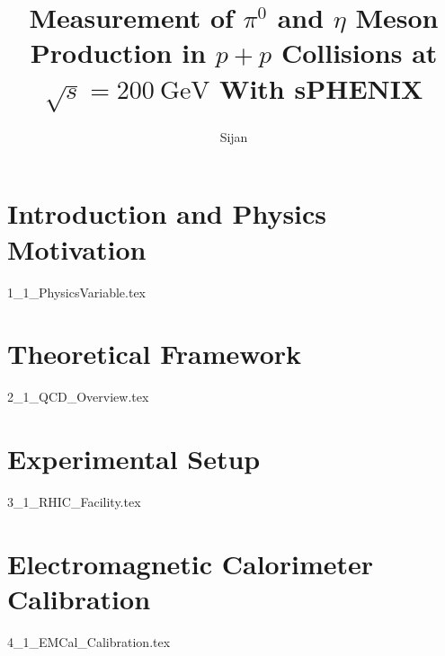 \documentclass[numbered]{ohio-etd} %
\title{Measurement of \texorpdfstring{$\pi^{0}$}{pi0} and \texorpdfstring{$\eta$}{eta} Meson Production in \texorpdfstring{$p+p$}{p+p} Collisions at \texorpdfstring{$\sqrt{s} = 200~\mathrm{GeV}$}{sqrt(sNN) = 200 GeV} With sPHENIX}
\author    {Sijan}{Regmi}
\begin{document}
\makefrontmatter    %



\chapter{Introduction and Physics Motivation}
{1_1_PhysicsVariable.tex}


\chapter{Theoretical Framework}
{2_1_QCD_Overview.tex}


\chapter{Experimental Setup}
{3_1_RHIC_Facility.tex}


\chapter{Electromagnetic Calorimeter Calibration}
{4_1_EMCal_Calibration.tex}


\end{document}
